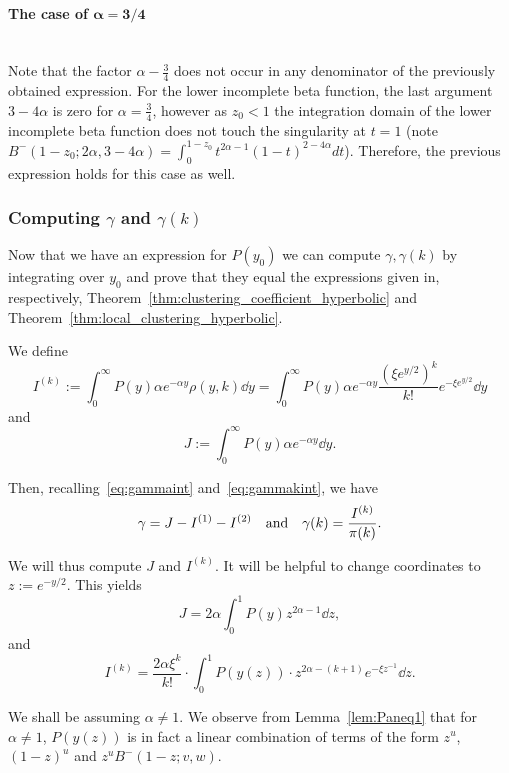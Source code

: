 \paragraph{The case of $\bm{\alpha = 3/4}$}\hfill\\

Note that the factor $\alpha-\frac{3}{4}$ does not occur in any denominator of the previously obtained expression. 
For the lower incomplete beta function, the last argument $3-4\alpha$ is zero for $\alpha=\frac{3}{4}$, however as $z_0 < 1$ the 
integration domain of the lower incomplete beta function does not touch the singularity at $t=1$ 
(note $B^-(1-z_0;2\alpha,3-4\alpha) = \int_0^{1-z_0} t^{2\alpha-1} (1-t)^{2-4\alpha}dt$). 
Therefore, the previous expression holds for this case as well.





\subsubsection{Computing \texorpdfstring{$\gamma$}{gamma} and \texorpdfstring{$\gamma(k)$}{gamma(k)}\label{ssec:exact_expressions_clustering_P}}



Now that we have an expression for $P(y_0)$ we can compute $\gamma, \gamma(k)$ by integrating 
over $y_0$ and prove that they equal the expressions given in, respectively, Theorem~\ref{thm:clustering_coefficient_hyperbolic} and 
Theorem~\ref{thm:local_clustering_hyperbolic}.

We define
\[
	I^{(k)} := 
	\int_0^{\infty} P(y) \alpha e^{-\alpha y}\rho(y,k) \dd y = 
	\int_0^{\infty} P(y) \alpha e^{-\alpha y} \frac{\left(\xi e^{y/2}\right)^k}{k!} e^{-\xi e^{y/2}} \dd y
\]
and
\[
	J := \int_0^\infty P(y) \alpha e^{-\alpha y} \dd y.
\]

Then, recalling~\eqref{eq:gammaint} and~\eqref{eq:gammakint}, we have
\[   
	\gamma = J - I^{(1)} - I^{(2)} \quad \text{and} \quad
	\gamma(k) = \frac{I^{(k)}}{{\pi}(k)}.
\]

We will thus compute $J$ and $I^{(k)}$. It will be helpful to change coordinates to $z := e^{-y/2}$. This yields 
\[ 
	J = 2 \alpha \int_0^1 P(y) z^{2\alpha-1} \dd z, 
\]
and 
\[ 
	I^{(k)} = \frac{2 \alpha \xi^k}{k!} \cdot \int_0^1 P(y(z)) \cdot z^{2\alpha-(k+1)} e^{-\xi z^{-1}} \dd z. 
\]

We shall be assuming $\alpha \not = 1$. 
We observe from Lemma~\ref{lem:Paneq1} that for $\alpha \not =1$, $P(y(z))$ is in fact a linear combination 
of terms of the form $z^u$, $(1-z)^u$ and $z^u B^-(1-z;v,w)$.

